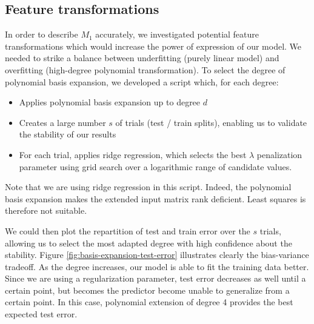 \documentclass{article} %
\begin{document}
  \subsection{Feature transformations}
  In order to describe $M_1$ accurately, we investigated potential feature transformations which would increase the power of expression of our model. We needed to strike a balance between underfitting (purely linear model) and overfitting (high-degree polynomial transformation). To select the degree of polynomial basis expansion, we developed a script which, for each degree:
  \begin{itemize}
    \item Applies polynomial basis expansion up to degree $d$
    \item Creates a large number $s$ of trials (test / train splits), enabling us to validate the stability of our results
    \item For each trial, applies ridge regression, which selects the best $\lambda$ penalization parameter using grid search over a logarithmic range of candidate values.
  \end{itemize}

  Note that we are using ridge regression in this script. Indeed, the polynomial basis expansion makes the extended input matrix rank deficient. Least squares is therefore not suitable.

  We could then plot the repartition of test and train error over the $s$ trials, allowing us to select the most adapted degree with high confidence about the stability. Figure \ref{fig:basis-expansion-test-error} illustrates clearly the bias-variance tradeoff. As the degree increases, our model is able to fit the training data better. Since we are using a regularization parameter, test error decreases as well until a certain point, but becomes the predictor become unable to generalize from a certain point. In this case, polynomial extension of degree 4 provides the best expected test error.
\end{document}
